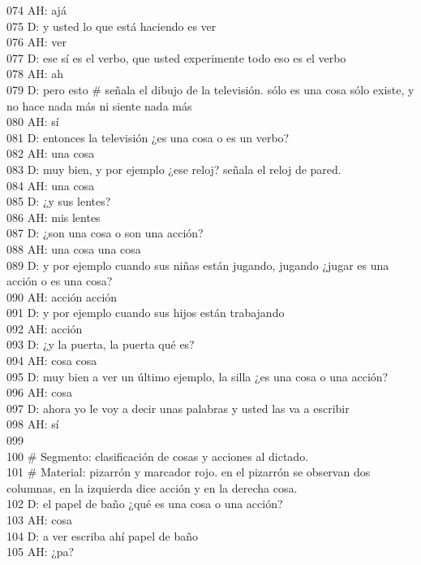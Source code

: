 074 AH: ajá\\
075 D: y usted lo que está haciendo es ver\\
076 AH: ver\\
077 D: ese sí es el verbo, que usted experimente todo eso es el verbo\\
078 AH: ah\\
079 D: pero esto \# señala el dibujo de la televisión. sólo es una cosa sólo existe, y no hace nada más ni siente nada más\\
080 AH: sí\\
081 D: entonces la televisión ¿es una cosa o es un verbo?\\
082 AH: una cosa\\
083 D: muy bien, y por ejemplo ¿ese reloj?  señala el reloj de pared.\\
084 AH: una cosa\\
085 D: ¿y sus lentes?\\
086 AH: mis lentes\\
087 D: ¿son una cosa o son una acción?\\
088 AH: una cosa una cosa\\
089 D: y por ejemplo cuando sus niñas están jugando, jugando ¿jugar es una acción o es una cosa?\\
090 AH: acción acción\\
091 D: y por ejemplo cuando sus hijos están trabajando\\
092 AH: acción\\
093 D: ¿y la puerta, la puerta qué es?\\
094 AH: cosa cosa\\
095 D: muy bien a ver un último ejemplo, la silla ¿es una cosa o una acción?\\
096 AH: cosa\\
097 D: ahora yo le voy a decir unas palabras y usted las va a escribir\\
098 AH: sí\\
099 \\
100 \# Segmento: clasificación de cosas y acciones al dictado.\\
101 \# Material: pizarrón y marcador rojo. en el pizarrón se observan dos columnas, en la izquierda dice acción y en la derecha cosa.\\
102 D: el papel de baño ¿qué es una cosa o una acción?\\
103 AH: cosa\\
104 D: a ver escriba ahí papel de baño\\
105 AH: ¿pa?\\
